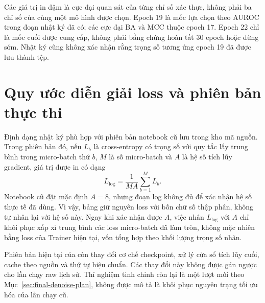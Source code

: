\documentclass[14pt,a4paper,oneside]{extreport}
\begin{document}
Các giá trị in đậm là cực đại quan sát của từng chỉ số xác thực,
không phải ba chỉ số của cùng một mô hình được chọn. Epoch 19 là
mốc lựa chọn theo AUROC trong đoạn nhật ký đã có; các cực đại BA và
MCC thuộc epoch 17. Epoch 22 chỉ là mốc cuối được cung cấp, không phải
bằng chứng hoàn tất 30 epoch hoặc dừng sớm. Nhật ký cũng không xác
nhận rằng trọng số tương ứng epoch 19 đã được lưu thành tệp.

\section{Quy ước diễn giải loss và phiên bản thực thi}
Định dạng nhật ký phù hợp với phiên bản notebook cũ lưu trong kho mã
nguồn. Trong phiên bản đó, nếu $L_b$ là cross-entropy có trọng số với
quy tắc lấy trung bình trong micro-batch thứ $b$, $M$ là số micro-batch
và $A$ là hệ số tích lũy gradient, giá trị được in có dạng
\begin{equation}
  L_{\mathrm{log}}=\frac{1}{MA}\sum_{b=1}^{M}L_b.
  \label{eq:legacy-logged-loss}
\end{equation}
Notebook cũ đặt mặc định $A=8$, nhưng đoạn log không đủ để xác nhận
hệ số thực tế đã dùng. Vì vậy, bảng giữ nguyên loss với bốn chữ số
thập phân, không tự nhân lại với hệ số này. Ngay khi xác nhận được
$A$, việc nhân $L_{\mathrm{log}}$ với $A$ chỉ khôi phục xấp xỉ trung
bình các loss micro-batch đã làm tròn, không mặc nhiên bằng loss
của Trainer hiện tại, vốn tổng hợp theo khối lượng trọng số nhãn.

Phiên bản hiện tại của  còn thay đổi
cơ chế checkpoint, xử lý cửa sổ tích lũy cuối, cache theo nguồn và
thứ tự hiệu chuẩn. Các thay đổi này không được gán ngược cho lần chạy
raw lịch sử. Thí nghiệm tinh chỉnh còn lại là một lượt mới theo
Mục~\ref{sec:final-denoise-plan}, không được mô tả là khôi phục nguyên
trạng tối ưu hóa của lần chạy cũ.

\end{document}
